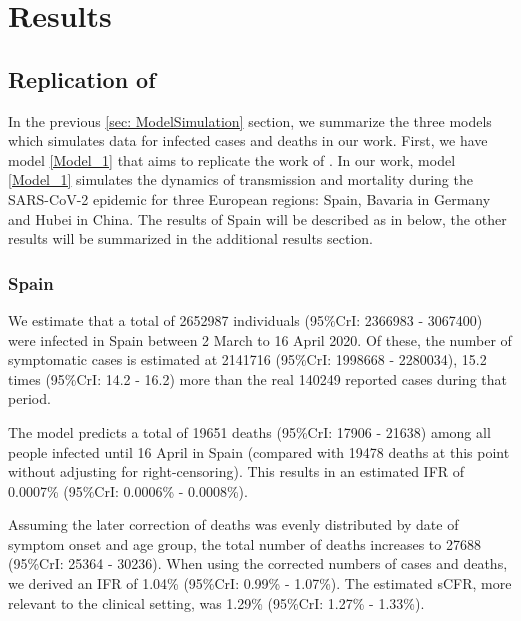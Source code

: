 \documentclass[../main.tex]{subfiles}
\begin{document}
 

\section{Results}
\label{sec: Result}




\subsection{Replication of \cite{the original work}}

In the previous \ref{sec: ModelSimulation} section, we summarize the three models which simulates data for infected cases and deaths in our work. First, we have model \ref{Model_1} that aims to replicate the work of \cite{the original work}. In our work, model \ref{Model_1} simulates the dynamics of transmission and mortality during the SARS-CoV-2 epidemic for three European regions: Spain, Bavaria in Germany and Hubei in China. The results of Spain will be described as in below, the other results will be summarized in the additional results section.

\subsubsection{Spain}
We estimate that a total of 2652987 individuals (95\%CrI: 2366983 - 3067400) were infected in Spain between 2 March to 16 April 2020. Of these, the number of symptomatic cases is estimated at 2141716  (95\%CrI: 1998668 - 2280034), 15.2 times (95\%CrI: 14.2 - 16.2)  more than the real 140249 reported cases during that period. 

The model predicts a total of 19651 deaths (95\%CrI: 17906 - 21638) among all people infected until 16 April in Spain (compared with 19478 deaths at this point without adjusting for right-censoring). This results in an estimated IFR of 0.0007\% (95\%CrI: 0.0006\% - 0.0008\%). 

Assuming the later correction of deaths was evenly distributed by date of
symptom onset and age group, the total number of deaths increases to 27688 (95\%CrI: 25364 - 30236). When using the corrected numbers of cases and deaths, we derived an IFR of 1.04\% (95\%CrI: 0.99\% - 1.07\%). The estimated sCFR, more relevant to the clinical setting, was 1.29\% (95\%CrI: 1.27\% - 1.33\%). 
\end{document}
